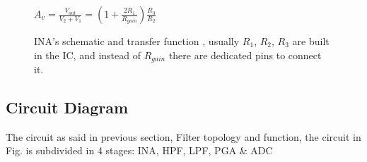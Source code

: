 \documentclass[a4paper, 10pt]{article} %
\newcommand{\parenciteit}[2]{\textit{\parencite[#1]{#2}}} %
\begin{document}
\begin{figure}
        $A_v=\frac{V_{out}}{V_2 + V_1}=\left(1+\frac{2 R_1}{R_{gain}}\right) \frac{R_3}{R_2}$
        \captionsetup{justification=centering}
        \caption{\small{INA's schematic and transfer function \parenciteit{}{INA:Wiki}, usually $R_1$, $R_2$, $R_3$ are built in the IC, and instead of $R_{gain}$ there are dedicated pins to connect it.}}
        \label{fig:INA}
    \end{figure}

    \subsection*{Circuit Diagram}
    \hspace{\parindent} The circuit as said in previous section, Filter topology and function, the circuit in Fig.%
    is subdivided in 4 stages: INA, HPF, LPF, PGA \& ADC

    \printbibheading
    \printbibliography[keyword=major, heading=subbibliography, title={Major Sources}]
    \printbibliography[keyword=minor, heading=subbibliography, title={Minor Sources}]
\end{document}
